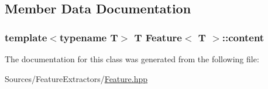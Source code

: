 \subsection{Member Data Documentation}
\hypertarget{class_feature_a4379bdef5cd2e91346a780210c6984d9}{
\subsubsection[{content}]{\setlength{\rightskip}{0pt plus 5cm}template$<$typename T$>$ T {\bf Feature}$<$ T $>$\+::content\hspace{0.3cm}{\ttfamily [protected]}}}\label{class_feature_a4379bdef5cd2e91346a780210c6984d9}


The documentation for this class was generated from the following file\+:\begin{DoxyCompactItemize}
\item 
Sources/\+Feature\+Extractors/\hyperlink{_feature_8hpp}{Feature.\+hpp}\end{DoxyCompactItemize}
